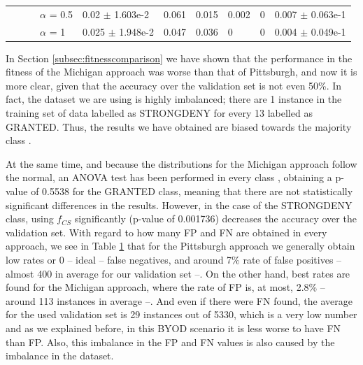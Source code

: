 \documentclass[runningheads]{llncs}
\begin{document}
\begin{table}[h!]
{\begin{tabular}{llll|l|l|l|l|l|l|}
			\multicolumn{1}{|l|}{}                                                                                             & \multicolumn{1}{l|}{}                                                                             & \multicolumn{1}{l|}{}                          & $\alpha$ = 0.5 & 0.02 $\pm$ 1.603e-2  & 0.061 & 0.015  & 0.002 & 0 & 0.007 $\pm$ 0.063e-1 \\ \cline{4-10} 
			\multicolumn{1}{|l|}{}                                                                                             & \multicolumn{1}{l|}{}                                                                             & \multicolumn{1}{l|}{}                          & $\alpha$ = 1   & 0.025 $\pm$ 1.948e-2 & 0.047 & 0.036  & 0     & 0 & 0.004 $\pm$ 0.049e-1 \\ \hline
		\end{tabular}
	}
	\label{tab:PvsMvalidation}
\end{table}

In Section \ref{subsec:fitnesscomparison} we have shown that the performance in the
fitness of the Michigan approach was worse than that of Pittsburgh,
and now it is more clear, given that the accuracy over the validation set is
not even 50\%. In fact, the dataset we are using is highly imbalanced; there are 1 instance
in the training set of data labelled as STRONGDENY for every 13
labelled as GRANTED. Thus, the results we have obtained are biased towards the majority
class \cite{japkowicz2002class}. 

At the same time, and because the distributions for the Michigan approach follow the normal, an ANOVA test has been performed in every class \cite{DerracTests11}, obtaining a p-value of 0.5538 for the GRANTED class, meaning that there are not statistically significant differences in the results. However, in the case of the STRONGDENY class, using $f_{CS}$ significantly (p-value of 0.001736) decreases the accuracy over the validation set. With regard to how many FP and FN are obtained in every approach, we see in Table \ref{tab:PvsMvalidation} that for the Pittsburgh approach we generally obtain low rates or 0 -- ideal -- false negatives, and around 7\% rate of false positives -- almost 400 in average for our validation set --. On the other hand, best rates are found for the Michigan approach, where the rate of FP is, at most, 2.8\% -- around 113 instances in average --. And even if there were FN found, the average for the used validation set is 29 instances out of 5330, which is a very low number and as we explained before, in this BYOD scenario it is less worse to have FN than FP. Also, this imbalance in the FP and FN values is also caused by the imbalance in the dataset.
\end{document}
